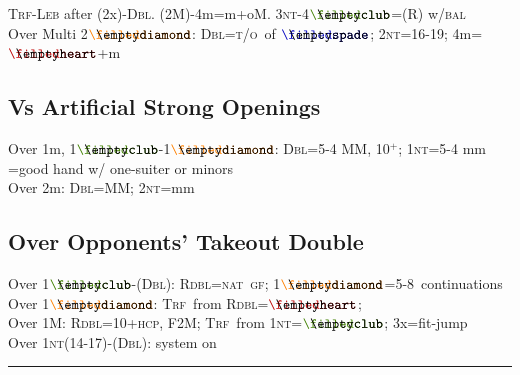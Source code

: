 \documentclass{article}
\newcommand\coloredsuitsymbol[3]{\ensuremath{\mathrel{\raisebox{-0.3pt}{{\color{#1}#2}\llap{#3}}}}}
\newcommand\suitsymbol[3]{\coloredsuitsymbol{#1}{#2}{#3}}%
\newcommand\C{\suitsymbol{clubcolor}{\filledclub}{\emptyclub}}
\newcommand\D{\suitsymbol{diamondcolor}{\filleddiamond}{\emptydiamond}}
\renewcommand\H{\suitsymbol{heartcolor}{\filledheart}{\emptyheart}}
\renewcommand\S{\suitsymbol{spadecolor}{\filledspade}{\emptyspade}}
\newcommand\N{\caps{nt}}
\newcommand\X{\caps{Dbl}}
\newcommand\XX{\caps{Rdbl}}
\newcommand\caps[1]{{\scshape#1}}
\newcommand\hcp{\caps{hcp}}
\newcommand\GF{\caps{gf}}
\newcommand\TRF{\caps{Trf}}
\newcommand\NAT{\caps{nat}}
\newcommand\takeout{\caps{t/o}}
\newcommand\more{\ensuremath{^+}}
\newcommand{\smallsection}[1]{\vspace{-1ex}\subsection*{#1}\raggedright}
\newcommand{\thinrule}{\rule{\textwidth}{\arrayrulewidth}}
\newcommand{\myendrule}{\vspace{-1.5ex}\thinrule}
\begin{document}
\begin{minipage}[t]{90mm}
	\caps{Trf-Leb} after (2x)-\X. (2M)-4m=m+oM. 3\N-4\C=(R) w/\caps{bal}\\
	Over Multi 2\D: \X=\takeout\ of \S; 2\N=16-19; 4m=\H+m
\smallsection{Vs Artificial Strong Openings} 
	Over 1m, 1\C-1\D: \X=5-4 MM, 10\more; 1\N=5-4 mm\\
	\quad2\N=good hand w/ one-suiter or minors\\
	Over 2m: \X=MM; 2\N=mm
\smallsection{Over Opponents' Takeout Double}
	Over 1\C-(\X): \XX=\NAT\ \GF; 1\D=5-8\rightarrow\NAT\ continuations\\
	Over 1\D: \TRF\ from \XX=\H;\\
	Over 1M: \XX=10+\hcp, F2M; \TRF\ from 1\N=\C; 3x=fit-jump\\
	Over 1\N(14-17)-(\X): system on\\
\myendrule
\end{minipage}
\hfill
\end{document}
